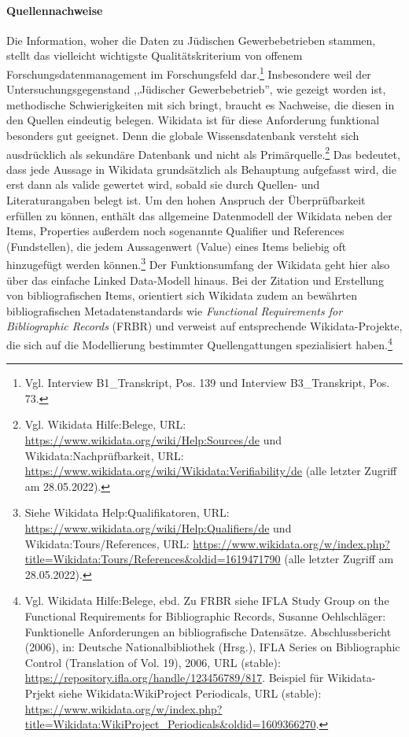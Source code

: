 \paragraph{Quellennachweise}

Die Information, woher die Daten zu Jüdischen Gewerbebetrieben stammen, stellt das vielleicht wichtigste Qualitätskriterium von offenem Forschungsdatenmanagement im Forschungsfeld dar.\footnote{Vgl. Interview B1\_Transkript, Pos. 139 und Interview B3\_Transkript, Pos. 73.} Insbesondere weil der Untersuchungsgegenstand ,,Jüdischer Gewerbebetrieb'', wie gezeigt worden ist, methodische Schwierigkeiten mit sich bringt, braucht es Nachweise, die diesen in den Quellen eindeutig belegen. Wikidata ist für diese Anforderung funktional besonders gut geeignet. Denn die globale Wissensdatenbank versteht sich ausdrücklich als sekundäre Datenbank und nicht als Primärquelle.\footnote{Vgl. Wikidata Hilfe:Belege, URL: \url{https://www.wikidata.org/wiki/Help:Sources/de} und Wikidata:Nachprüfbarkeit, URL: \url{https://www.wikidata.org/wiki/Wikidata:Verifiability/de} (alle letzter Zugriff am 28.05.2022).} Das bedeutet, dass jede Aussage in Wikidata grundsätzlich als Behauptung aufgefasst wird, die erst dann als valide gewertet wird, sobald sie durch Quellen- und Literaturangaben belegt ist. Um den hohen Anspruch der Überprüfbarkeit erfüllen zu können, enthält das allgemeine Datenmodell der Wikidata neben der Items, Properties außerdem noch sogenannte Qualifier und References (Fundstellen), die jedem Aussagenwert (Value) eines Items beliebig oft hinzugefügt werden können.\footnote{Siehe Wikidata Help:Qualifikatoren, URL: \url{https://www.wikidata.org/wiki/Help:Qualifiers/de} und Wikidata:Tours/References, URL: \url{https://www.wikidata.org/w/index.php?title=Wikidata:Tours/References&oldid=1619471790} (alle letzter Zugriff am 28.05.2022).} Der Funktionsumfang der Wikidata geht hier also über das einfache Linked Data-Modell hinaus. Bei der Zitation und Erstellung von bibliografischen Items, orientiert sich Wikidata zudem an bewährten bibliografischen Metadatenstandards wie \textit{Functional Requirements for Bibliographic Records} (FRBR) und verweist auf entsprechende Wikidata-Projekte, die sich auf die Modellierung bestimmter Quellengattungen spezialisiert haben.\footnote{Vgl. Wikidata Hilfe:Belege, ebd. Zu FRBR siehe IFLA Study Group on the Functional Requirements for Bibliographic Records, Susanne Oehlschläger: Funktionelle Anforderungen an bibliografische Datensätze. Abschlussbericht (2006), in: Deutsche Nationalbibliothek (Hrsg.), IFLA Series on Bibliographic Control (Translation of Vol. 19), 2006, URL (stable): \url{https://repository.ifla.org/handle/123456789/817}. Beispiel für Wikidata-Prjekt siehe Wikidata:WikiProject Periodicals, URL (stable): \url{https://www.wikidata.org/w/index.php?title=Wikidata:WikiProject_Periodicals&oldid=1609366270}.} 

